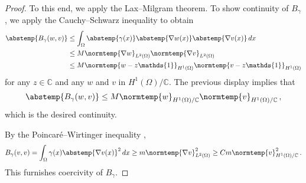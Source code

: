 \documentclass[pdflatex,sn-mathphys-num]{sn-jnl-preprint}
\newcommand{\C}{\mathbb{C}}
\newcommand{\norm}{\normtemp}
\newcommand{\abs}{\abstemp}
\newcommand{\diff}{d}
\newcommand{\dd}[1]{\,\diff{#1}}
\newcommand{\onebm}{\mathds{1}} %
\theoremstyle{thmstyleone}%
\theoremstyle{thmstyletwo}%
\theoremstyle{thmstylethree}%
\numberwithin{equation}{section}
\numberwithin{theorem}{section}
\begin{document}
\begin{appendices}
\begin{proof}
    To this end, we apply the Lax--Milgram theorem. To show continuity of $B_\gamma$, we apply the Cauchy--Schwarz inequality to obtain
    \begin{align*}
        \abs{B_\gamma(w,v)}&\leq \int_\Omega \abs{\gamma(x)}\abs{\nabla w(x)}\abs{\nabla v(x)}\dd{x}\\
        &\leq M\norm{\nabla w}_{L^2(\Omega)}\norm{\nabla v}_{L^2(\Omega)}\\
        &\leq M\norm{w-z\onebm}_{H^1(\Omega)}\norm{v-z\onebm}_{H^1(\Omega)}
    \end{align*}
    for any $z\in\C$ and any $w$ and $v$ in $H^1(\Omega)/\C$. The previous display implies that
    \begin{align*}
        \abs{B_\gamma(w,v)}\leq M \norm{w}_{H^1(\Omega)/\C}\norm{v}_{H^1(\Omega)/\C}\,,
    \end{align*}
    which is the desired continuity.
    
    By the Poincar\'e--Wirtinger inequality \cite[Remark~1, p.~376]{hanke2011convex},
    \begin{align*}
        B_\gamma(v,v)=\int_\Omega \gamma(x)\abs{\nabla v(x)}^2\dd{x}
        \geq m \norm{\nabla v}^2_{L^2(\Omega)}
        \geq Cm\norm{v}^2_{H^1(\Omega)/\C}\,.
    \end{align*}
    This furnishes coercivity of $B_\gamma$.
    

\end{proof}
\end{appendices}
\end{document}
